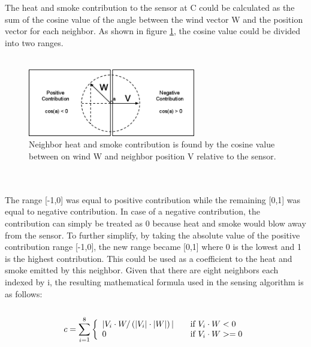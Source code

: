 \\\\
The heat and smoke contribution to the sensor at C could be calculated as the sum of the cosine value of the angle between the wind vector W and the position vector for each neighbor. As shown in figure \ref{fig:sensor-contribution}, the cosine value could be divided into two ranges.
\\\\
\begin{figure}[here]
\centering
\includegraphics[width=0.65\textwidth]{solution/graphics/sensor-contribution.png}
\caption{Neighbor heat and smoke contribution is found by the cosine value between on wind W and neighbor position V relative to the sensor.}
\label{fig:sensor-contribution}
\end{figure}
\\\\
The range [-1,0] was equal to positive contribution while the remaining [0,1] was equal to negative contribution. In case of a negative contribution, the contribution can simply be treated as 0 because heat and smoke would blow away from the sensor. To further simplify, by taking the absolute value of the positive contribution range [-1,0], the new range became [0,1] where 0 is the lowest and 1 is the highest contribution. This could be used as a coefficient to the heat and smoke emitted by this neighbor. Given that there are eight neighbors each indexed by i, the resulting mathematical formula used in the sensing algorithm is as follows:
\\\\
\[
  c = \sum_{\substack i=1}^8\left\{
  \begin{array}{l l}
    |V_i \cdot W / \left(|V_i | \cdot |W| \right)| & \quad \text{if $V_i \cdot W < 0$}\\
   0 & \quad \text{if $V_i \cdot W >= 0$}\\
  \end{array} \right.
\]
\\\\
